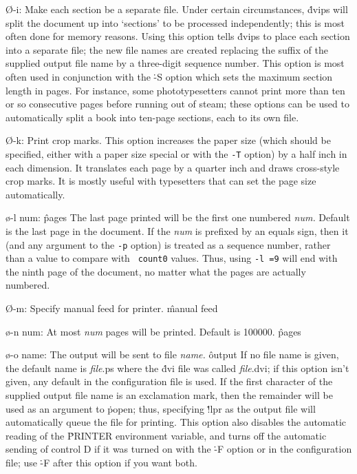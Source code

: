 {\O-i: Make each section be a separate file.  Under certain circumstances,
\.{dvips} will split the document up into `sections' to be processed
independently; this is most often done for memory reasons.  Using this
option tells \.{dvips} to place each section into a separate file; the
new file names are created replacing the suffix of the supplied output
file name by a three-digit sequence number.
This option is most often used in
conjunction with the \.{-S} option which sets the maximum section length
in pages.  For instance, some phototypesetters cannot print more than
ten or so consecutive pages before running out of steam; these options
can be used to automatically split a book into ten-page sections, each
to its own file.

\O-k:  Print crop marks.  This option increases the paper size
(which should be specified, either with a paper size special or
with the {\tt -T} option) by a half inch in each dimension.  It
translates each page by a quarter inch and draws cross-style
crop marks.  It is mostly useful with typesetters that can set
the page size automatically.

\o-l num:
\^{pages}
The last page printed will be the first one numbered {\it num.}
Default is the last page in the document.  If the {\it num} is
prefixed by an equals sign, then it (and any argument to the
{\tt -p} option) is treated as a sequence number, rather than
a value to compare with {\tt {} count0} values.  Thus,
using {\tt -l =9} will end with the ninth page of the document,
no matter what the pages are actually numbered.

\O-m:  Specify manual feed for printer.
\^{manual feed}

\o-n num:
At most {\it num} pages will be printed. Default is 100000.
\^{pages}

\o-o name:  The output will be sent to file {\it name.}
\^{output}
If no file name is given, the default name is \.{{\it file}.ps} where
the \.{dvi} file was called \.{{\it file}.dvi};
if this option isn't given, any default in the configuration file is used.
If the first character of the supplied output file name is an
exclamation mark, then
the remainder will be used as an argument to \.{popen}; thus, specifying
\.{!lpr} as the output file will automatically queue the file for printing.
This option also disables the automatic reading of the \.{PRINTER}
environment variable, and turns off the automatic sending of control D
if it was turned on with the \.{-F} option or in the configuration file;
use \.{-F} after this option if you want both.

}
